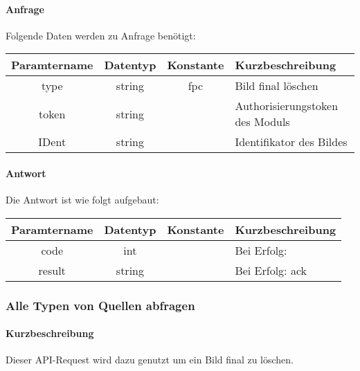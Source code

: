 \paragraph{Anfrage}Folgende Daten werden zu Anfrage benötigt:
\begin{table}[H]
	\begin{tabular}{|c|c|c|p{6.5cm}|}
		\hline
		\textbf{Paramtername} & \textbf{Datentyp} & \textbf{Konstante} & \textbf{Kurzbeschreibung}                                                                                               \\ \hline
		type                & string            & fpc                & Bild final löschen \\ \hline
		token               & string            &                    & Authorisierungstoken des Moduls \\ \hline
		IDent               & string            &                    & Identifikator des Bildes \\ \hline
	\end{tabular}
\end{table}
\paragraph{Antwort}Die Antwort ist wie folgt aufgebaut:
\begin{table}[H]
	\begin{tabular}{|c|c|c|p{6.5cm}|}
		\hline
		\textbf{Paramtername} & \textbf{Datentyp} & \textbf{Konstante} & \textbf{Kurzbeschreibung}            \\ \hline                
		code                & int              &                 & Bei Erfolg: {\glqq 0\grqq} \\ \hline
		result              & string           &                 & Bei Erfolg: {\glqq ack\grqq} \\ \hline
	\end{tabular}
\end{table}
\subsubsection{Alle Typen von Quellen abfragen}
\paragraph{Kurzbeschreibung}Dieser API-Request wird dazu genutzt um ein Bild final zu löschen.
